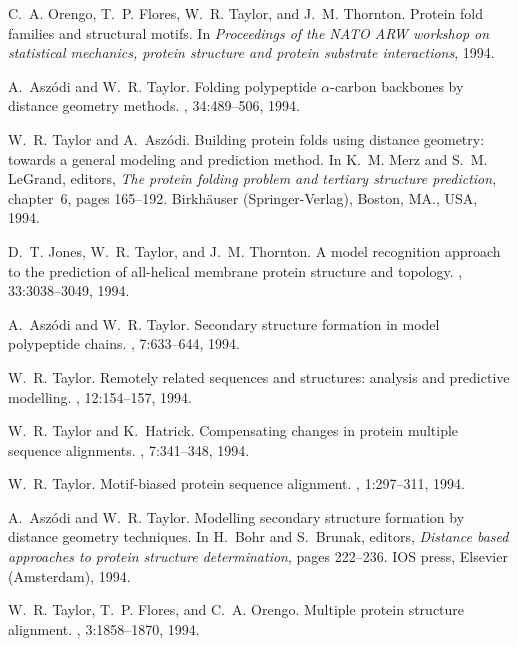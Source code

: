 \begin{thebibliography}{100}
C.~A. Orengo, T.~P. Flores, W.~R. Taylor, and J.~M. Thornton.
\newblock Protein fold families and structural motifs.
\newblock In {\em Proceedings of the {NATO ARW} workshop on statistical
  mechanics, protein structure and protein substrate interactions}, 1994.

A.~Asz\'{o}di and W.~R. Taylor.
\newblock Folding polypeptide $\alpha$-carbon backbones by distance geometry
  methods.
, 34:489--506, 1994.

W.~R. Taylor and A.~Asz\'{o}di.
\newblock Building protein folds using distance geometry: towards a general
  modeling and prediction method.
\newblock In K.~M. Merz and S.~M. Le{G}rand, editors, {\em The protein folding
  problem and tertiary structure prediction}, chapter~6, pages 165--192.
  Birkh{\"{a}}user (Springer-Verlag), Boston, MA., USA, 1994.

D.~T. Jones, W.~R. Taylor, and J.~M. Thornton.
\newblock A model recognition approach to the prediction of all-helical
  membrane protein structure and topology.
, 33:3038--3049, 1994.

A.~Asz\'{o}di and W.~R. Taylor.
\newblock Secondary structure formation in model polypeptide chains.
, 7:633--644, 1994.

W.~R. Taylor.
\newblock Remotely related sequences and structures: analysis and predictive
  modelling.
, 12:154--157, 1994.

W.~R. Taylor and K.~Hatrick.
\newblock Compensating changes in protein multiple sequence alignments.
, 7:341--348, 1994.

W.~R. Taylor.
\newblock Motif-biased protein sequence alignment.
, 1:297--311, 1994.

A.~Asz\'{o}di and W.~R. Taylor.
\newblock Modelling secondary structure formation by distance geometry
  techniques.
\newblock In H.~Bohr and S.~Brunak, editors, {\em Distance based approaches to
  protein structure determination}, pages 222--236. IOS press, Elsevier
  (Amsterdam), 1994.

W.~R. Taylor, T.~P. Flores, and C.~A. Orengo.
\newblock Multiple protein structure alignment.
, 3:1858--1870, 1994.


\end{thebibliography}
